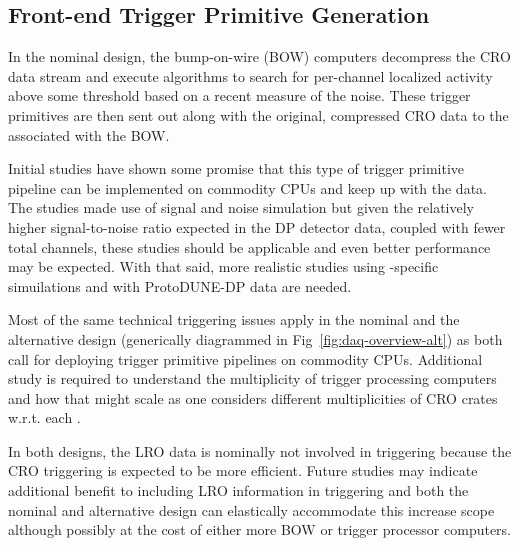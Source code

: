 \subsection{Front-end Trigger Primitive Generation}
\label{sec:fd-daq-fetp}


In the nominal design, the bump-on-wire (BOW) computers decompress the
CRO data stream and execute algorithms to search for per-channel
localized activity above some threshold based on a recent measure of
the noise. 
These trigger primitives are then sent out along with the original,
compressed CRO data to the  associated with the BOW.

Initial studies have shown some promise that this type of trigger
primitive pipeline can be implemented on commodity CPUs and keep up
with the data. 
The studies made use of  signal and noise simulation but
given the relatively higher signal-to-noise ratio expected in the DP
detector data, coupled with fewer total channels, these studies should
be applicable and even better performance may be expected. 
With that said, more realistic studies using -specific
simuilations and with ProtoDUNE-DP data are needed.

Most of the same technical triggering issues apply in the nominal and
the alternative design (generically diagrammed in
Fig~\ref{fig:daq-overview-alt}) as both call for deploying trigger
primitive pipelines on commodity CPUs. 
Additional study is required to understand the multiplicity of trigger
processing computers and how that might scale as one considers
different multiplicities of CRO  crates w.r.t. each
.

In both designs, the LRO data is nominally not involved in triggering
because the CRO triggering is expected to be more efficient.
Future studies may indicate additional benefit to including LRO
information in triggering and both the nominal and alternative design
can elastically accommodate this increase scope although possibly at
the cost of either more BOW or trigger processor computers.


